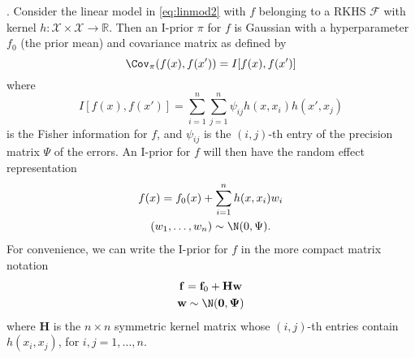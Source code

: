 \begin{theorem}{.}\label{theorem:iprior}
	Consider the linear model in \eqref{eq:linmod2} with $f$ belonging to a RKHS $\mathcal F$ with kernel $h:\mathcal X \times \mathcal X \rightarrow \mathbb R$. Then an I-prior $\pi$ for $f$ is Gaussian with a hyperparameter $f_0$ (the prior mean) and covariance matrix as defined by
	\[
		\Cov_\pi(f(x), f(x')) = I[f(x),f(x')]
	\]
	where
	\[
		I[f(x),f(x')] = \sum_{i=1}^n\sum_{j=1}^n \psi_{ij} h(x,x_i)h(x',x_j)
	\]
	is the Fisher information for $f$, and $\psi_{ij}$ is the $(i,j)$-th entry of the precision matrix $\Psi$ of the errors. An I-prior for $f$ will then have the random effect representation
	\begin{align*}
	\begin{gathered}
		f(x) = f_0(x) + \sum_{i=1}^n h(x, x_i)w_i \\
		(w_1,\dots,w_n) \sim \N(0, \Psi).
	\end{gathered}
	\end{align*}
	For convenience, we can write the I-prior for $f$ in the more compact matrix notation
	\begin{align*}
	\begin{gathered}
		\mathbf f = \mathbf f_0 + \mathbf H \mathbf w \\
		\mathbf w \sim \N(\mathbf 0, \boldsymbol\Psi) \\
	\end{gathered}
	\end{align*}
	where $\mathbf H$ is the $n\times n$ symmetric kernel matrix whose $(i,j)$-th entries contain $h(x_i, x_j)$, for $i,j=1,\dots,n$.
\end{theorem}

